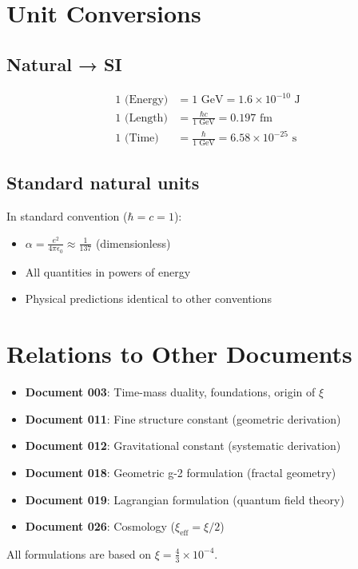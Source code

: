 	\section{Unit Conversions}
	
	\subsection{Natural → SI}
	
	\begin{align}
		1 \text{ (Energy)} &= 1 \text{ GeV} = 1.6 \times 10^{-10} \text{ J} \\
		1 \text{ (Length)} &= \frac{\hbar c}{1 \text{ GeV}} = 0.197 \text{ fm} \\
		1 \text{ (Time)} &= \frac{\hbar}{1 \text{ GeV}} = 6.58 \times 10^{-25} \text{ s}
	\end{align}
	
	\subsection{Standard natural units}
	
	In standard convention ($\hbar = c = 1$):
	\begin{itemize}
		\item $\alpha = \frac{e^2}{4\pi\epsilon_0} \approx \frac{1}{137}$ (dimensionless)
		\item All quantities in powers of energy
		\item Physical predictions identical to other conventions
	\end{itemize}
	
	\section{Relations to Other Documents}
	
	\begin{itemize}
		\item \textbf{Document 003}: Time-mass duality, foundations, origin of $\xi$
		\item \textbf{Document 011}: Fine structure constant (geometric derivation)
		\item \textbf{Document 012}: Gravitational constant (systematic derivation)
		\item \textbf{Document 018}: Geometric g-2 formulation (fractal geometry)
		\item \textbf{Document 019}: Lagrangian formulation (quantum field theory)
		\item \textbf{Document 026}: Cosmology ($\xi_{\text{eff}} = \xi/2$)
	\end{itemize}
	
	All formulations are based on $\xi = \frac{4}{3} \times 10^{-4}$.
	